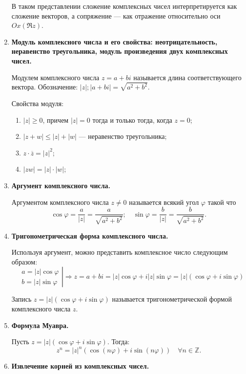 \begin{enumerate}
В таком представлении сложение комплексных чисел интерпретируется как сложение векторов, а сопряжение — как отражение относительно оси $Ox (\Re z)$.

\item \textbf{Модуль комплексного числа и его свойства: неотрицательность, неравенство треугольника, модуль произведения двух комплексных чисел.}

Модулем комплексного числа $z = a + bi$ называется длина соответствующего вектора. Обозначение: $|z|; |a+bi| = \sqrt{a^2 + b^2}$.

Свойства модуля:
\begin{enumerate}
\item $|z| \geqslant 0$, причем $|z| = 0$ тогда и только тогда, когда $z = 0$;
\item $|z + w| \leqslant |z| + |w|$ — неравенство треугольника;
\item $z\cdot\overline{z} = |z|^2$;
\item $|zw| = |z| \cdot |w|$;
\end{enumerate}
\item \textbf{Аргумент комплексного числа.}

Аргументом комплексного числа $z \neq 0$  называется всякий угол $\varphi$ такой что 
\[
\cos \varphi = \frac{a}{|z|} = \frac{a}{\sqrt{a^2 + b^2}}; \quad \sin \varphi = \frac{b}{|z|} = \frac{b}{\sqrt{a^2 + b^2}}.
\]
\item \textbf{Тригонометрическая форма комплексного числа.}

Используя аргумент, можно представить комплексное число следующим образом:
\[
\left.
\begin{aligned}
&a = |z|\cos \varphi \\
&b = |z|\sin \varphi
\end{aligned} 
\right| \Rightarrow z = a + bi = |z| \cos \varphi + i |z| \sin \varphi = |z|(\cos\varphi + i\sin\varphi)
\] 

Запись $z = |z|(\cos\varphi + i\sin\varphi)$ называется тригонометрической формой \\ комплексного числа $z$.

\item \textbf{Формула Муавра.}

Пусть $z = |z|\left(\cos\varphi + i \sin \varphi\right)$. Тогда:
\[z^n = |z|^n\left(\cos\left(n\varphi\right)+i\sin\left(n\varphi\right)\right) \quad \forall n \in \mathbb{Z}.
\]

\item \textbf{Извлечение корней из комплексных чисел.}


\end{enumerate}
